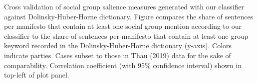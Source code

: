 Cross validation of social group salience measures generated with our classifier against Dolinsky-Huber-Horne dictionary. Figure compares the share of sentences per manifesto that contain at least one social group mention according to our classifier to the share of sentences per manifesto that contain at least one group keyword recorded in the Dolinsky-Huber-Horne dictionary (y-axis). Colors indicate parties. Cases subset to those in Thau (2019) data for the sake of comparability. Correlation coefficient (with 95\% confidence interval) shown in top-left of plot panel. \label{fig:uk_manifestos_sg_salience_ours_vs_dhh}
